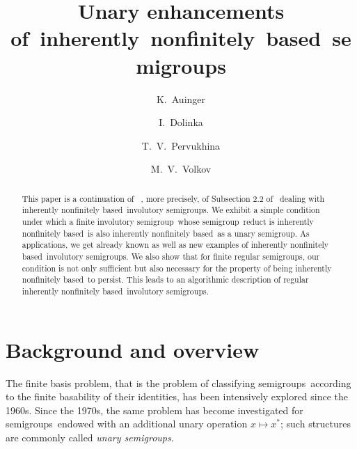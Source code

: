 \documentclass[11pt,reqno]{amsart}
\newcommand{\sgp}{semi\-group}
\newcommand{\sgps}{semi\-groups}
\newcommand{\is}{involutory semi\-group}
\newcommand{\iss}{involutory semi\-groups}
\newcommand{\fbp}{finite basis problem}
\newcommand{\infb}{inherently non\-finitely based}
\begin{document}
\title{Unary enhancements of~inherently~nonfinitely~based~semigroups}
\author{K.~Auinger}
\address{Fakult\"at f\"ur Mathematik, Universit\"at Wien, Nordbergstrasse 15,  A-1090 Wien, Austria}

\author{I.~Dolinka}
\address{ Department of Mathematics and Informatics, University of Novi Sad, Trg Do\-si\-teja Obradovi\'ca 4, 21101 Novi Sad, Serbia}

\author{T.~V.~Pervukhina}
\address{Institute of Mathematics and Computer Science, Ural Federal University, Lenina 51, 620000 Ekaterinburg, Russia}

\author{M.~V.~Volkov}

\begin{abstract}
This paper is a continuation of ~\cite{ADV:2012}, more precisely, of Subsection 2.2 of~\cite{ADV:2012} dealing with \infb\ \iss. We exhibit
a simple condition under which a finite \is\ whose \sgp\ reduct is \infb\ is also \infb\ as a unary \sgp. As applications, we get already
known as well as new examples of \infb\ \iss. We also show that for finite regular semigroups, our condition is not only sufficient but
also necessary for the property of being \infb\ to persist. This leads to an algorithmic description of regular \infb\ \iss.
\end{abstract}

\maketitle

\section{Background and overview}

The \fbp, that is the problem of classifying \sgps\ according to the finite basability of their identities, has been intensively explored
since the 1960s. Since the 1970s, the same problem has become investigated for \sgps\ endowed with an additional unary operation $x\mapsto
x^*$; such structures are commonly called \emph{unary \sgps}.
\end{document}
